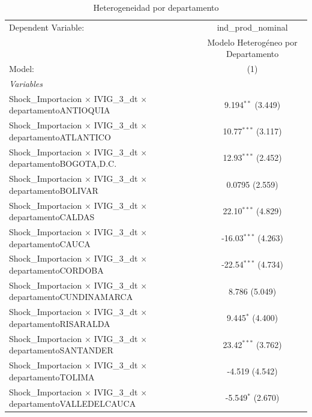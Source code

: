 \documentclass[12pt]{article}
\begin{document}
\setcounter{table}{10}
\begin{table}[htbp]
\centering
\begin{threeparttable}

   \caption{Heterogeneidad por departamento}
   \centering
   \small
   \begin{tabular}{lc}
      \tabularnewline \midrule \midrule
      Dependent Variable:                                                             & ind\_prod\_nominal\\    
                                                                                      & Modelo Heterogéneo por Departamento \\   
      Model:                                                                          & (1)\\  
      \midrule
      \emph{Variables}\\
      Shock\_Importacion $\times$ IVIG\_3\_dt $\times$ departamentoANTIOQUIA          & 9.194$^{**}$ (3.449)\\   
      Shock\_Importacion $\times$ IVIG\_3\_dt $\times$ departamentoATLANTICO          & 10.77$^{***}$ (3.117)\\   
      Shock\_Importacion $\times$ IVIG\_3\_dt $\times$ departamentoBOGOTA,D.C.        & 12.93$^{***}$ (2.452)\\   
      Shock\_Importacion $\times$ IVIG\_3\_dt $\times$ departamentoBOLIVAR            & 0.0795 (2.559)\\   
      Shock\_Importacion $\times$ IVIG\_3\_dt $\times$ departamentoCALDAS             & 22.10$^{***}$ (4.829)\\   
      Shock\_Importacion $\times$ IVIG\_3\_dt $\times$ departamentoCAUCA              & -16.03$^{***}$ (4.263)\\   
      Shock\_Importacion $\times$ IVIG\_3\_dt $\times$ departamentoCORDOBA            & -22.54$^{***}$ (4.734)\\   
      Shock\_Importacion $\times$ IVIG\_3\_dt $\times$ departamentoCUNDINAMARCA       & 8.786 (5.049)\\   
      Shock\_Importacion $\times$ IVIG\_3\_dt $\times$ departamentoRISARALDA          & 9.445$^{*}$ (4.400)\\   
      Shock\_Importacion $\times$ IVIG\_3\_dt $\times$ departamentoSANTANDER          & 23.42$^{***}$ (3.762)\\   
      Shock\_Importacion $\times$ IVIG\_3\_dt $\times$ departamentoTOLIMA             & -4.519 (4.542)\\   
      Shock\_Importacion $\times$ IVIG\_3\_dt $\times$ departamentoVALLEDELCAUCA      & -5.549$^{*}$ (2.670)\\   

\end{tabular}
\end{threeparttable}
\end{table}
\end{document}
